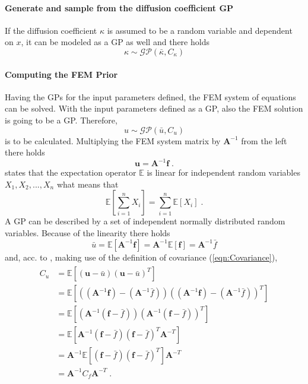 \documentclass[%
  a4paper,oneside,%
  11pt,%
  smallchapters,
  style=printdev,
  extramargin,
  green,%
  rgb, <cmyk>
  ]{tubsbook}
\begin{document}
\paragraph{Generate and sample from the diffusion coefficient GP}
If the diffusion coefficient $\kappa$ is assumed to be a random variable and dependent on $x$, it can be modeled as a GP as well and there holds
\begin{equation}
\kappa \sim \mathcal{GP}(\bar{\kappa},C_{\kappa})
\end{equation}

\paragraph{Computing the FEM Prior}
Having the GPs for the input parameters defined, the FEM system of equations can be solved. With the input parameters defined as a GP, also the FEM solution is going to be a GP. Therefore, 
\begin{equation}
u \sim \mathcal{GP}(\bar{u}, C_u)
\end{equation}
is to be calculated. Multiplying the FEM system matrix by $\bm{A}^{-1}$ from the left there holds
\begin{equation}
\bm{u} = \bm{A}^{-1}\bm{f} \;.
\end{equation}
\cite[p. 1428]{arens2015} states that the expectation operator $\mathbb{E}$ is linear for independent random variables $X_1,X_2,...,X_n$ what means that
\begin{equation}
\mathbb{E}\left[  \sum_{i=1}^n X_i \right] = \sum_{i=1}^n \mathbb{E}[X_i] \;.
\end{equation}
A GP can be described by a set of independent normally distributed random variables. Because of the linearity there holds
\begin{equation}
\bar{u} = \mathbb{E}[\bm{A}^{-1} \bm{f}] = \bm{A}^{-1} \mathbb{E}[\bm{f}] = \bm{A}^{-1} \bar{f}
\end{equation}
and, acc. to \cite{schon2011, bardsley2018}, making use of the definition of covariance (\ref{eqn:Covariance}),
\begin{align}
\begin{split}
C_u &= \mathbb{E}[(\bm{u}-\bar{u})(\bm{u}-\bar{u})^T] \\
	&= \mathbb{E}\left[\left((\bm{A}^{-1} \bm{f}) - (\bm{A}^{-1} \bar{f}) \right) \left( (\bm{A}^{-1} \bm{f}) - (\bm{A}^{-1} \bar{f}) \right)^T   \right]\\
	&= \mathbb{E}\left[  \left( \bm{A}^{-1}(\bm{f}-\bar{f})   \right)  \left( \bm{A}^{-1}(\bm{f}-\bar{f})   \right)^T  \right]\\
	&= \mathbb{E} \left[    \bm{A}^{-1} ( \bm{f} - \bar{f} ) ( \bm{f} - \bar{f} )^T \bm{A}^{-T}   \right]\\
	&= \bm{A}^{-1}   \mathbb{E}\left[ (\bm{f}-\bar{f}) (\bm{f}-\bar{f})^T   \right] \bm{A}^{-T} \\
	&= \bm{A}^{-1} C_f \bm{A}^{-T}  \;.
\end{split}
\end{align}
\end{document}
